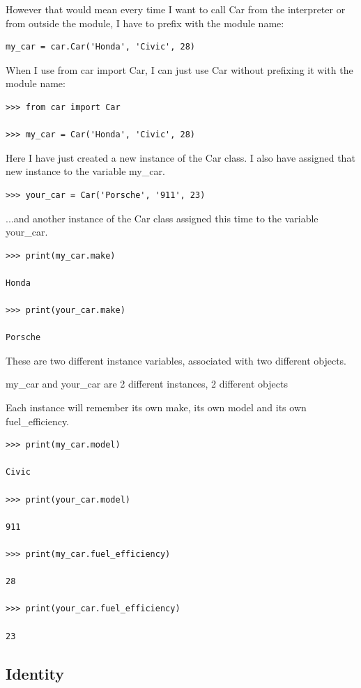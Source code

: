 \documentclass{article}
\begin{document}
However that would mean every time I want to call Car from the interpreter or from outside the module,  I have to prefix with the module name:

\begin{lstlisting}
my_car = car.Car('Honda', 'Civic', 28)
\end{lstlisting}

When I use from car import Car, I can just use Car without prefixing it with the module name:

\begin{lstlisting}
>>> from car import Car

>>> my_car = Car('Honda', 'Civic', 28)
\end{lstlisting}

Here I have just created a new instance of the Car class.  I also have assigned that new instance to the variable my{\_}car.

\begin{lstlisting}
>>> your_car = Car('Porsche', '911', 23)
\end{lstlisting}

...and another instance of the Car class assigned this time to the variable your{\_}car.

\begin{lstlisting}
>>> print(my_car.make)

Honda

>>> print(your_car.make)

Porsche
\end{lstlisting}

These are two different instance variables, associated with two different objects. 

my{\_}car and your{\_}car are 2 different instances, 2 different objects

Each instance will remember its own make, its own model and its own fuel{\_}efficiency.

\begin{lstlisting}
>>> print(my_car.model)

Civic

>>> print(your_car.model)

911

>>> print(my_car.fuel_efficiency)

28

>>> print(your_car.fuel_efficiency)

23
\end{lstlisting}

\subsection{Identity}
\end{document}
